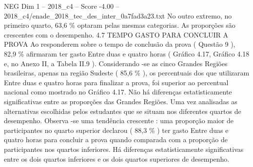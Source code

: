\begin{textsample}{NEG Dim 1 – 2018\_c4 – Score -4.00 – 2018\_c4/enade\_2018\_tec\_des\_inter\_0a7fad3a23.txt}
No outro extremo, no primeiro quarto, 63,6 \% optaram pelas mesmas categorias.
As proporções são crescentes com o desempenho. 4.7 TEMPO GASTO PARA CONCLUIR A PROVA Ao responderem sobre o tempo de conclusão da prova ( Questão 9 ), 82,9 \% afirmaram ter gasto Entre duas e quatro horas ( Gráfico 4.17, Gráfico 4.18 e, no Anexo II, a Tabela II.9 ).
Considerando -se as cinco Grandes Regiões brasileiras, apenas na região Sudeste ( 85,6 \% ), os percentuais dos que utilizaram Entre duas e quatro horas para finalizar a prova, foi superior ao percentual nacional como mostrado no Gráfico 4.17.
Não há diferenças estatisticamente significativas entre as proporções das Grandes Regiões.
Uma vez analisadas as alternativas escolhidas pelos estudantes que se situam nos diferentes quartos de desempenho.
Observa -se uma tendência crescente : uma proporção maior de participantes no quarto superior declarou ( 88,3 \% ) ter gasto Entre duas e quatro horas para concluir a prova quando comparada com a proporção de participantes nos quartos inferiores.
Há diferenças estatisticamente significativas entre os dois quartos inferiores e os dois quartos superiores de desempenho.

\end{textsample}
